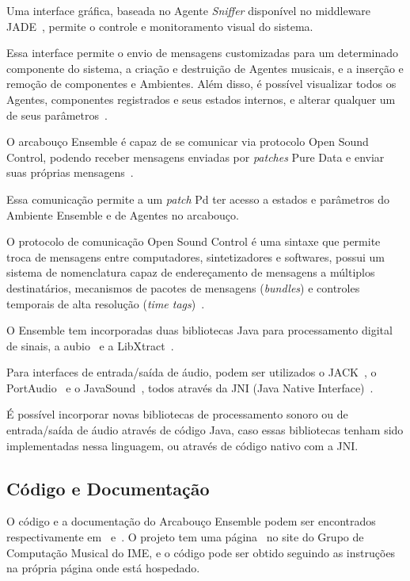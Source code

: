 \documentclass[a4paper, 11pt, twoside]{article}
\begin{document}
\begin{multicols}{2}
Uma interface gráfica, baseada no Agente \textit{Sniffer} disponível no middleware 
JADE~\cite{belli99}, permite o controle e monitoramento visual do sistema.

Essa interface permite o envio de mensagens customizadas para um determinado 
componente do sistema, a criação e destruição de Agentes musicais, e a inserção e 
remoção de componentes e Ambientes. Além disso, é possível visualizar todos os 
Agentes, componentes registrados e seus estados internos, e alterar qualquer um de 
seus parâmetros~\cite{leandro11}.

O arcabouço Ensemble é capaz de se comunicar via protocolo Open Sound 
Control, podendo receber mensagens enviadas por \textit{patches}
Pure Data e enviar suas próprias mensagens~\cite{leandro11}. 

Essa comunicação permite a um \textit{patch} Pd ter acesso a estados e 
parâmetros do Ambiente Ensemble e de Agentes no arcabouço.

O protocolo de comunicação Open Sound Control é uma sintaxe que permite troca de 
mensagens entre computadores, sintetizadores e softwares, possui um sistema de 
nomenclatura capaz de endereçamento de mensagens a múltiplos destinatários, 
mecanismos de pacotes de mensagens (\textit{bundles}) e controles 
temporais de alta resolução (\textit{time tags})~\cite{wright97}.

O Ensemble tem incorporadas duas bibliotecas Java para processamento digital de 
sinais, a aubio~\cite{aubio01} e a LibXtract~\cite{libx01}.

Para interfaces de entrada/saída de áudio, podem ser utilizados o 
JACK~\cite{jack01}, o PortAudio~\cite{port01} e o JavaSound~\cite{jsnd01}, 
todos através da JNI (Java Native Interface)~\cite{JNI}.

É possível incorporar novas bibliotecas de processamento sonoro ou de 
entrada/saída de áudio através de código Java, caso essas bibliotecas
tenham sido implementadas nessa linguagem, ou através de código nativo
com a JNI.

\subsection{Código e Documentação}

O código e a documentação do Arcabouço Ensemble podem ser encontrados
respectivamente em~\cite{ensemblecode} e~\cite{ensembledoc}.
O projeto tem uma página~\cite{ensemblegrouppage} no site do Grupo de Computação 
Musical do IME, e o código pode ser obtido seguindo as instruções na própria página
onde está hospedado.


\end{multicols}
\end{document}

